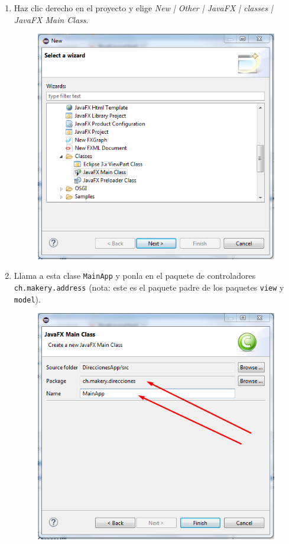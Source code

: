 \begin{enumerate}
	\item Haz clic derecho en el proyecto y elige\textit{ New | Other | JavaFX | classes | JavaFX Main Class}.
	\begin{figure}[H]
		\includegraphics[width=11cm]{img/fxMainClass}
	\end{figure}
	
	\item Llama a esta clase \textcolor{codigo}{\texttt{MainApp}} y ponla en el paquete de controladores \textcolor{codigo}{\texttt{ch.makery.address}} (nota: este es el paquete padre de los paquetes \textcolor{codigo}{\texttt{view}} y \textcolor{codigo}{\texttt{model}}).
	\begin{figure}[H]
		\includegraphics[width=11cm]{img/MainApp}
	\end{figure}
\end{enumerate}

